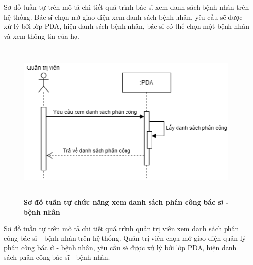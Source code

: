 Sơ đồ tuần tự trên mô tả chi tiết quá trình bác sĩ xem danh sách bệnh nhân trên hệ thống. Bác sĩ chọn mở giao diện xem danh sách bệnh nhân, 
yêu cầu sẽ được xử lý bởi lớp PDA, hiện danh sách bệnh nhân, bác sĩ có thể chọn một bệnh nhân và xem thông tin của họ. 

\begin{figure}[H]
  \centering
  \includegraphics[width=11cm,height=8cm]{Images/sequence/sequence_manage_pda.png}
  \caption[Sơ đồ tuần tự chức năng xem danh sách phân công bác sĩ - bệnh nhân]{\bfseries \fontsize{12pt}{0pt}
  \selectfont Sơ đồ tuần tự chức năng xem danh sách phân công bác sĩ - bệnh nhân}
  \label{sequence_manage_pda} %
\end{figure}
Sơ đồ tuần tự trên mô tả chi tiết quá trình quản trị viên xem danh sách phân công bác sĩ - bệnh nhân trên hệ thống. Quản trị viên chọn mở giao diện
quản lý phân công bác sĩ - bệnh nhân, yêu cầu sẽ được xử lý bởi lớp PDA, hiện danh sách phân công bác sĩ - bệnh nhân. 

